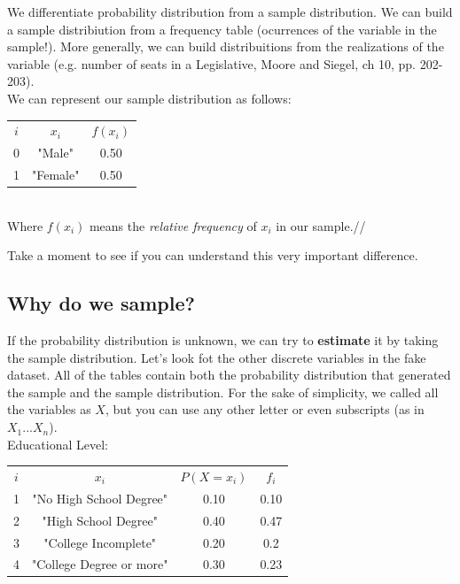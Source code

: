 \documentclass[11pt]{article}
\begin{document}
	We differentiate probability distribution from a sample distribution. We can build a sample distribiution from a frequency table (ocurrences of the variable in the sample!). More generally, we can build distribuitions from the realizations of the variable (e.g. number of seats in a Legislative, Moore and Siegel, ch 10, pp. 202-203).\\
	
	We can represent our sample distribution as follows:\\
	
\begin{tabular}{|c|c|c|}
\hline
	$i$ & $x_i$ & $f(x_i)$\\
	\cline{1-3}
	0 & "Male" & 0.50\\
	1 & "Female" & 0.50\\
\hline
\end{tabular}\\
	
	Where $f(x_i)$ means the \emph{relative frequency} of $x_i$ in our sample.//

	Take a moment to see if you can understand this very important difference.

	\subsection*{Why do we sample?}
	
	If the probability distribution is unknown, we can try to \textbf{estimate} it by taking the sample distribution. Let's look fot the other discrete variables in the fake dataset. All of the tables contain both the probability distribution that generated the sample and the sample distribution. For the sake of simplicity, we called all the variables as $X$, but you can use any other letter or even subscripts (as in $X_1 ... X_n$).\\
	
	Educational Level:\\
	
\begin{tabular}{|c|c|c|c|}
\hline
	$i$ & $x_i$ & $P(X=x_i)$ & $f_i$\\
	\cline{1-4}
	1 & "No High School Degree" & 0.10 & 0.10\\
	2 & "High School Degree" & 0.40 & 0.47\\
	3 & "College Incomplete" & 0.20 & 0.2\\
	4 & "College Degree or more" & 0.30 & 0.23\\	
\hline
\end{tabular}\newline\\
\end{document}
